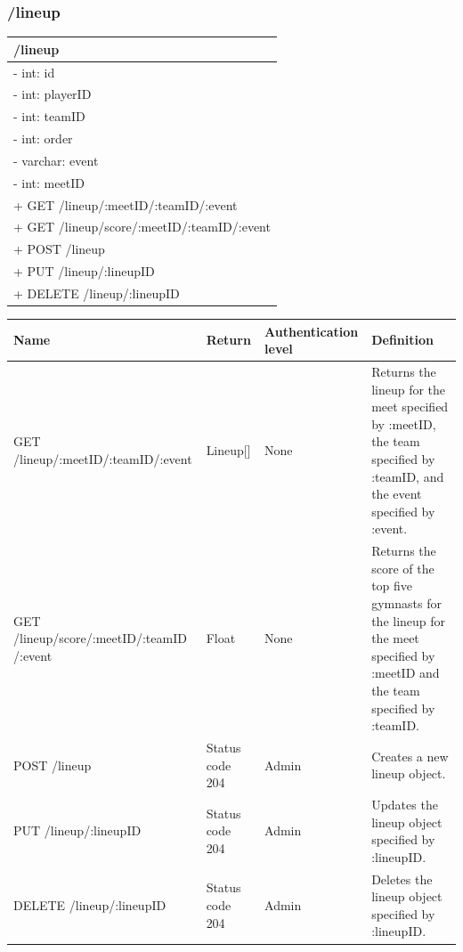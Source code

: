 \documentclass[letterpaper,10pt,draftclsnofoot,onecolumn,]{article}
\begin{document}
\subsubsection{/lineup}
\begin{center}
    \begin{tabular}{| p{22em} |}
        \hline
        \textbf{/lineup} \\
        \hline
        - int: id \\
        - int: playerID \\
        - int: teamID \\
        - int: order \\
        - varchar: event \\
        - int: meetID \\
        \hline
        + GET /lineup/:meetID/:teamID/:event \\
        + GET /lineup/score/:meetID/:teamID/:event \\
        + POST /lineup \\
        + PUT /lineup/:lineupID \\
        + DELETE /lineup/:lineupID \\
        \hline
    \end{tabular}
\end{center}
\begin{center}
    \begin{tabular}{ | p{15em} | p{8em} | p{7em} | p{20em} | }
        \hline
        \textbf{Name} & \textbf{Return} & \textbf{Authentication level} & \textbf{Definition} \\
        \hline
        GET /lineup/:meetID/:teamID/:event & Lineup[] & None & Returns the lineup for the meet specified by :meetID, the team specified by :teamID, and the event specified by :event. \\
        \hline
        GET /lineup/score/:meetID/:teamID /:event & Float & None & Returns the score of the top five gymnasts for the lineup for the meet specified by :meetID and the team specified by :teamID. \\
        \hline
        POST /lineup & Status code 204 & Admin & Creates a new lineup object. \\
        \hline
        PUT /lineup/:lineupID & Status code 204 & Admin & Updates the lineup object specified by :lineupID. \\
        \hline
        DELETE /lineup/:lineupID & Status code 204 & Admin & Deletes the lineup object specified by :lineupID. \\
        \hline
    \end{tabular}
\end{center}
\end{document}
